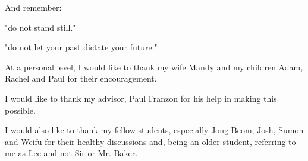 \begin{biography}

And remember:

"do not stand still."  

"do not let your past dictate your future."


\end{biography}

\begin{acknowledgements}
At a personal level, I would like to thank my wife Mandy and my children Adam, Rachel and Paul for their encouragement.

I would like to thank my advisor, Paul Franzon for his help in making this possible.

I would also like to thank my fellow students, especially Jong Beom, Josh, Sumon and Weifu for their healthy discussions and, being an older student, referring to me as Lee and not Sir or Mr. Baker.

\end{acknowledgements}


\iftrue

\thesistableofcontents

\thesislistoftables

\thesislistoffigures

\fi
